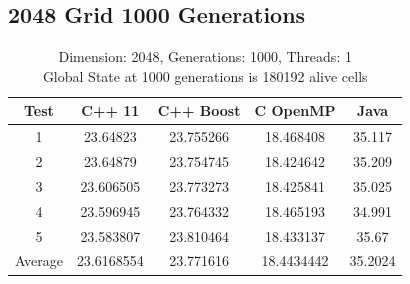 \documentclass[11pt]{article} %
\begin{document}
\subsection{2048 Grid 1000 Generations}
\begin{table}[ht]

\caption{Dimension: 2048, Generations: 1000, Threads: 1\\Global State at 1000 generations is 180192 alive cells} %

\centering %

\begin{tabular}{c c c c c} %

\hline\hline %

Test & C++ 11 & C++ Boost & C OpenMP & Java \\ [0.5ex] %


\hline %

1 & 23.64823 & 23.755266 & 18.468408 & 35.117 \\
2 & 23.64879 & 23.754745 & 18.424642 & 35.209 \\
3 & 23.606505 & 23.773273 & 18.425841 & 35.025 \\
4 & 23.596945 & 23.764332 & 18.465193 & 34.991 \\
5 & 23.583807 & 23.810464 & 18.433137 & 35.67 \\
Average & 23.6168554 & 23.771616 & 18.4434442 & 35.2024 \\ [1ex]



\hline %

\end{tabular}
\end{table}
\end{document}
